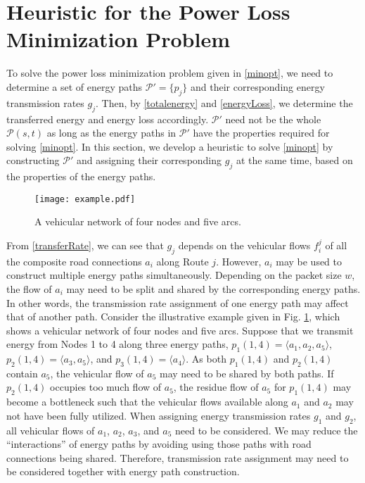 \documentclass[journal]{IEEEtran}
\begin{document}
\section{Heuristic for the Power Loss Minimization Problem} \label{sec:heuristic}


To solve the power loss minimization problem given in \eqref{minopt}, we need to determine a set of energy paths $\mathcal{P}'=\{p_j\}$ and their corresponding energy transmission rates $g_j$. Then, by \eqref{totalenergy} and \eqref{energyLoss}, we determine the  transferred energy and energy loss accordingly. $\mathcal{P}'$ need not be the whole $\mathcal{P}(s,t)$ as long as the energy paths in $\mathcal{P}'$ have the properties required for solving \eqref{minopt}.
In this section,  we develop a heuristic to solve \eqref{minopt} by constructing $\mathcal{P}'$ and assigning their corresponding $g_j$ at the same time, based on the properties of the energy paths.

\begin{figure}[!t]
\centering
\texttt{[image: example.pdf]}
\caption{A vehicular network of four nodes and five arcs.}
\label{fig:example}
\end{figure}

From \eqref{transferRate}, we can see that $g_j$ depends on the vehicular flows $f_i^j$ of all the composite road connections $a_i$ along Route $j$. However, $a_i$ may be used to construct multiple energy paths simultaneously. Depending on the packet size $w$, the flow of $a_i$ may need to be split and shared by the corresponding energy paths. In other words, the transmission rate assignment of one energy path may affect that of another path. 
Consider the illustrative example given in Fig. \ref{fig:example}, which shows a vehicular network of four nodes and five arcs. Suppose that we transmit energy from Nodes 1 to 4 along three energy paths, $p_1(1,4)=\langle a_1,a_2, a_5 \rangle$, $p_2(1,4)=\langle a_3, a_5 \rangle$, and $p_3(1,4)=\langle a_4 \rangle$. As both $p_1(1,4)$ and $p_2(1,4)$ contain $a_5$, the vehicular flow of $a_5$ may need to be shared by both paths. If $p_2(1,4)$ occupies too much flow of $a_5$, the residue flow of $a_5$ for $p_1(1,4)$ may become a bottleneck such that the vehicular flows available along $a_1$ and $a_2$ may not have been fully utilized. When assigning energy transmission rates $g_1$ and $g_2$, all vehicular flows of $a_1$, $a_2$, $a_3$, and $a_5$ need to be considered.
We may reduce the ``interactions'' of energy paths by avoiding using those paths with road connections being shared. Therefore,  transmission rate assignment may need to be considered together with energy path construction. 
\end{document}

